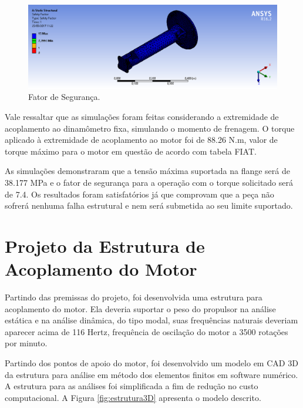 \begin{figure}[h!]
	\centering
	\includegraphics[keepaspectratio=true,scale= 0.33]{figuras/Fator_de_Seguranca.png}
	\caption{Fator de Segurança.}
	\label{fig:fatorseguranca}
\end{figure}

\vfill

Vale ressaltar que as simulações foram feitas considerando a extremidade de acoplamento ao dinamômetro fixa, simulando o momento de frenagem. O torque aplicado à extremidade de acoplamento ao motor foi de 88.26 N.m, valor de torque máximo para o motor em questão de acordo com  tabela FIAT.

As simulações demonstraram que a tensão máxima suportada na flange será de 38.177 MPa e o fator de segurança para a operação com o torque solicitado será de 7.4. Os resultados foram satisfatórios já que comprovam que a peça não sofrerá nenhuma falha estrutural e nem será submetida ao seu limite suportado.


\section{Projeto da Estrutura de Acoplamento do Motor}

Partindo das premissas do projeto, foi desenvolvida uma estrutura para acoplamento do motor. Ela deveria suportar o peso do propulsor na análise estática e na análise dinâmica, do tipo modal, suas frequências naturais deveriam aparecer acima de 116 Hertz, frequência de oscilação do motor a 3500 rotações por minuto.

Partindo dos pontos de apoio do motor, foi desenvolvido um modelo em CAD 3D da estrutura para análise em método dos elementos finitos em software numérico. A estrutura para as análises foi simplificada a fim de redução no custo computacional. A Figura \ref{fig:estrutura3D} apresenta o modelo descrito.

